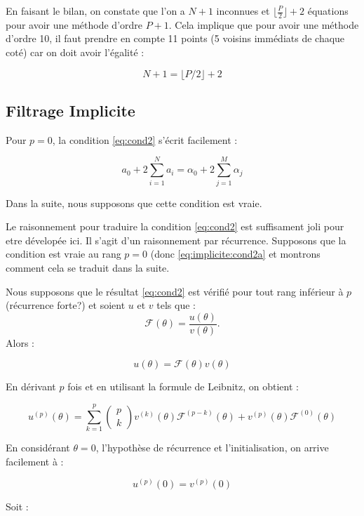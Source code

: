 \documentclass[10pt,a4paper]{amsart}
\begin{document}
En faisant le bilan, on constate que l'on a $N+1$ inconnues et $\lfloor \frac{P}{2} \rfloor + 2$ équations pour avoir une méthode d'ordre $P+1$. Cela implique que pour avoir une méthode d'ordre 10, il faut prendre en compte 11 points (5 voisins immédiats de chaque coté) car on doit avoir l'égalité :

\begin{equation}
  \label{eq:explicite:cond}
  N+1 = \lfloor P/2 \rfloor + 2
\end{equation}
  
\subsection{Filtrage Implicite}

Pour $p=0$, la condition \eqref{eq:cond2} s'écrit facilement :

\begin{equation}
  \label{eq:implicite:cond2a}
  a_0 + 2 \sum_{i=1}^N a_i = \alpha_0 + 2 \sum_{j=1}^M \alpha_j
\end{equation}

Dans la suite, nous supposons que cette condition est vraie.


Le raisonnement pour traduire la condition \eqref{eq:cond2} est suffisament joli pour etre dévelopée ici. Il s'agit d'un raisonnement par récurrence. Supposons que la condition est vraie au rang $p=0$ (donc \eqref{eq:implicite:cond2a} et montrons comment cela se traduit dans la suite.

Nous supposons que le résultat \eqref{eq:cond2} est vérifié pour tout rang inférieur à $p$ (récurrence forte?) et soient $u$ et $v$ tels que :
$$\mathcal{F} ( \theta ) = \dfrac{u(\theta)}{v(\theta)}.$$ Alors :

$$u( \theta ) = \mathcal{F}(\theta) v( \theta )$$

En dérivant $p$ fois et en utilisant la formule de Leibnitz, on obtient :

$$u^{(p)} ( \theta ) = \sum_{k=1}^p \left( \begin{array}{c}p \\ k\end{array}  \right) v^{(k)} ( \theta ) \mathcal{F}^{(p-k)} ( \theta ) + v^{(p)} ( \theta ) \mathcal{F}^{(0)} (\theta) $$

En considérant $\theta = 0$, l'hypothèse de récurrence et l'initialisation, on arrive facilement à :

$$u^{ (p) } (0) =  v^{(p)} (0)$$

Soit :
\end{document}
